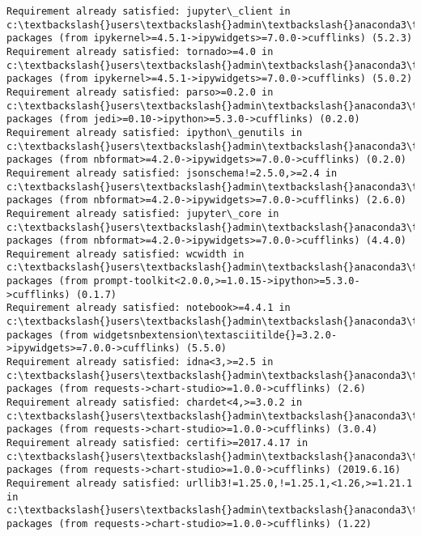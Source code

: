 \documentclass[11pt]{article}
\begin{document}
\begin{Verbatim}[commandchars=\\\{\}]
Requirement already satisfied: jupyter\_client in c:\textbackslash{}users\textbackslash{}admin\textbackslash{}anaconda3\textbackslash{}lib\textbackslash{}site-packages (from ipykernel>=4.5.1->ipywidgets>=7.0.0->cufflinks) (5.2.3)
Requirement already satisfied: tornado>=4.0 in c:\textbackslash{}users\textbackslash{}admin\textbackslash{}anaconda3\textbackslash{}lib\textbackslash{}site-packages (from ipykernel>=4.5.1->ipywidgets>=7.0.0->cufflinks) (5.0.2)
Requirement already satisfied: parso>=0.2.0 in c:\textbackslash{}users\textbackslash{}admin\textbackslash{}anaconda3\textbackslash{}lib\textbackslash{}site-packages (from jedi>=0.10->ipython>=5.3.0->cufflinks) (0.2.0)
Requirement already satisfied: ipython\_genutils in c:\textbackslash{}users\textbackslash{}admin\textbackslash{}anaconda3\textbackslash{}lib\textbackslash{}site-packages (from nbformat>=4.2.0->ipywidgets>=7.0.0->cufflinks) (0.2.0)
Requirement already satisfied: jsonschema!=2.5.0,>=2.4 in c:\textbackslash{}users\textbackslash{}admin\textbackslash{}anaconda3\textbackslash{}lib\textbackslash{}site-packages (from nbformat>=4.2.0->ipywidgets>=7.0.0->cufflinks) (2.6.0)
Requirement already satisfied: jupyter\_core in c:\textbackslash{}users\textbackslash{}admin\textbackslash{}anaconda3\textbackslash{}lib\textbackslash{}site-packages (from nbformat>=4.2.0->ipywidgets>=7.0.0->cufflinks) (4.4.0)
Requirement already satisfied: wcwidth in c:\textbackslash{}users\textbackslash{}admin\textbackslash{}anaconda3\textbackslash{}lib\textbackslash{}site-packages (from prompt-toolkit<2.0.0,>=1.0.15->ipython>=5.3.0->cufflinks) (0.1.7)
Requirement already satisfied: notebook>=4.4.1 in c:\textbackslash{}users\textbackslash{}admin\textbackslash{}anaconda3\textbackslash{}lib\textbackslash{}site-packages (from widgetsnbextension\textasciitilde{}=3.2.0->ipywidgets>=7.0.0->cufflinks) (5.5.0)
Requirement already satisfied: idna<3,>=2.5 in c:\textbackslash{}users\textbackslash{}admin\textbackslash{}anaconda3\textbackslash{}lib\textbackslash{}site-packages (from requests->chart-studio>=1.0.0->cufflinks) (2.6)
Requirement already satisfied: chardet<4,>=3.0.2 in c:\textbackslash{}users\textbackslash{}admin\textbackslash{}anaconda3\textbackslash{}lib\textbackslash{}site-packages (from requests->chart-studio>=1.0.0->cufflinks) (3.0.4)
Requirement already satisfied: certifi>=2017.4.17 in c:\textbackslash{}users\textbackslash{}admin\textbackslash{}anaconda3\textbackslash{}lib\textbackslash{}site-packages (from requests->chart-studio>=1.0.0->cufflinks) (2019.6.16)
Requirement already satisfied: urllib3!=1.25.0,!=1.25.1,<1.26,>=1.21.1 in c:\textbackslash{}users\textbackslash{}admin\textbackslash{}anaconda3\textbackslash{}lib\textbackslash{}site-packages (from requests->chart-studio>=1.0.0->cufflinks) (1.22)

\end{Verbatim}
\end{document}
